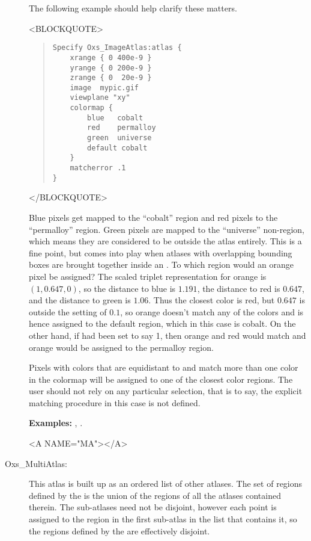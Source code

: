 \begin{description}
The following example should help clarify these matters.
\begin{rawhtml}<BLOCKQUOTE>\end{rawhtml}
\begin{quote}
\begin{verbatim}
Specify Oxs_ImageAtlas:atlas {
    xrange { 0 400e-9 }
    yrange { 0 200e-9 }
    zrange { 0  20e-9 }
    image  mypic.gif
    viewplane "xy"
    colormap {
        blue   cobalt
        red    permalloy
        green  universe
        default cobalt
    }
    matcherror .1
}
\end{verbatim}
\end{quote}
\begin{rawhtml}</BLOCKQUOTE>\end{rawhtml}
Blue pixels get mapped to the ``cobalt'' region and red pixels
to the ``permalloy'' region.  Green pixels are mapped to the
``universe'' non-region, which means they are considered to be outside
the atlas entirely.  This is a fine point, but comes into
play when atlases with overlapping bounding boxes are brought together
inside an .  To which region would an orange pixel
be assigned?  The scaled triplet representation for orange is
$(1,0.647,0)$, so the distance to blue is $1.191$, the distance to red
is $0.647$, and the distance to green is $1.06$.  Thus the closest color
is red, but $0.647$ is outside the  setting of $0.1$, so
orange doesn't match any of the colors and is hence assigned to the
default region, which in this case is cobalt.  On the other hand, if
 had been set to say 1, then orange and red would match
and orange would be assigned to the permalloy region.

Pixels with colors that are equidistant to and match more than one color
in the colormap will be assigned to one of the closest color regions.
The user should not rely on any particular selection, that is to say,
the explicit matching procedure in this case is not defined.

\textbf{Examples:} , .

\begin{rawhtml}<A NAME="MA"></A>\end{rawhtml}%
%
\item[Oxs\_MultiAtlas:]
This atlas is built up as an ordered list of
other atlases.  The set of regions defined by the 
is the union of the regions of all the atlases contained therein.  The
sub-atlases need not be disjoint, however each point is assigned to the
region in the first sub-atlas in the list that contains it, so the
regions defined by the  are effectively disjoint.


\end{description}
